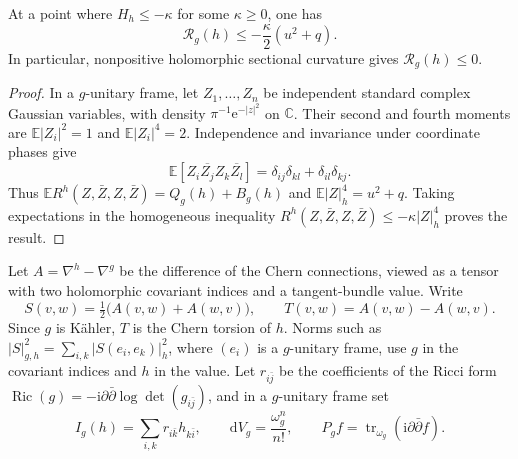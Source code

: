 \begin{lemma}\label{lem:hermitian-sectional-average}
At a point where $H_h\leq-\kappa$ for some $\kappa\geq0$, one has
\[
 \mathcal R_g(h)\leq-\frac{\kappa}{2}(u^2+q).
\]
In particular, nonpositive holomorphic sectional curvature gives $\mathcal R_g(h)\leq0$.
\end{lemma}
\begin{proof}
In a $g$-unitary frame, let $Z_1,\ldots,Z_n$ be independent standard complex Gaussian variables, with density $\pi^{-1}\mathrm e^{-|z|^2}$ on $\mathbb C$. Their second and fourth moments are $\mathbb E|Z_i|^2=1$ and $\mathbb E|Z_i|^4=2$. Independence and invariance under coordinate phases give
\[
 \mathbb E[Z_i\overline{Z_j}Z_k\overline{Z_l}]
      =\delta_{ij}\delta_{kl}+\delta_{il}\delta_{kj}.
\]
Thus $\mathbb E R^h(Z,\bar Z,Z,\bar Z)=Q_g(h)+B_g(h)$ and
$\mathbb E|Z|_h^4=u^2+q$. Taking expectations in the homogeneous inequality
$R^h(Z,\bar Z,Z,\bar Z)\leq-\kappa|Z|_h^4$ proves the result.
\end{proof}

Let $A=\nabla^h-\nabla^g$ be the difference of the Chern connections, viewed as a tensor with two holomorphic covariant indices and a tangent-bundle value. Write
\[
 S(v,w)=\tfrac12\bigl(A(v,w)+A(w,v)\bigr),\qquad
 T(v,w)=A(v,w)-A(w,v).
\]
Since $g$ is K\"ahler, $T$ is the Chern torsion of $h$. Norms such as
$|S|_{g,h}^2=\sum_{i,k}|S(e_i,e_k)|_h^2$, where $(e_i)$ is a $g$-unitary frame, use $g$ in the covariant indices and $h$ in the value. Let $r_{i\bar j}$ be the coefficients of the Ricci form
$\operatorname{Ric}(g)=-\mathrm i\partial\bar\partial\log\det(g_{i\bar j})$, and in a $g$-unitary frame set
\[
 I_g(h)=\sum_{i,k}r_{i\bar k}h_{k\bar i},\qquad
 \mathrm dV_g=\frac{\omega_g^n}{n!},\qquad
 P_g f=\operatorname{tr}_{\omega_g}(\mathrm i\partial\bar\partial f).
\]


